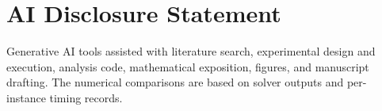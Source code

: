 \documentclass{article}
\begin{document}
\section*{AI Disclosure Statement}
Generative AI tools assisted with literature search, experimental design and execution, analysis code, mathematical exposition, figures, and manuscript drafting. The numerical comparisons are based on solver outputs and per-instance timing records.




\clearpage
\appendix

\end{document}
